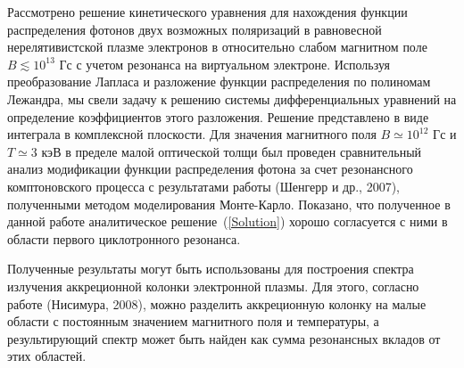 \documentclass{pazh2col-win}
\begin{document}
Рассмотрено решение кинетического уравнения для нахождения функции распределения фотонов двух возможных поляризаций в равновесной нерелятивистской плазме электронов в относительно слабом магнитном поле $B\lesssim 10^{13}$ Гс с учетом резонанса на виртуальном электроне. Используя преобразование Лапласа и разложение функции распределения по полиномам Лежандра, мы свели задачу к решению системы дифференциальных уравнений на определение коэффициентов этого разложения. Решение представлено в виде интеграла в комплексной плоскости. Для значения магнитного поля $B\simeq10^{12}$ Гс и $T\simeq3$ кэВ в пределе малой оптической толщи был проведен сравнительный анализ модификации функции распределения фотона за счет резонансного комптоновского процесса с результатами работы (Шенгерр и др., 2007), полученными методом моделирования Монте-Карло. Показано, что полученное в данной работе аналитическое решение~(\ref{Solution}) хорошо согласуется с ними в области первого циклотронного резонанса.
 
Полученные результаты могут быть использованы для построения спектра излучения аккреционной колонки электронной плазмы. Для этого, согласно работе (Нисимура, 2008), можно разделить аккреционную колонку на малые области с постоянным значением магнитного поля и температуры, а результирующий спектр может быть найден как сумма резонансных вкладов от этих областей.
\end{document}
